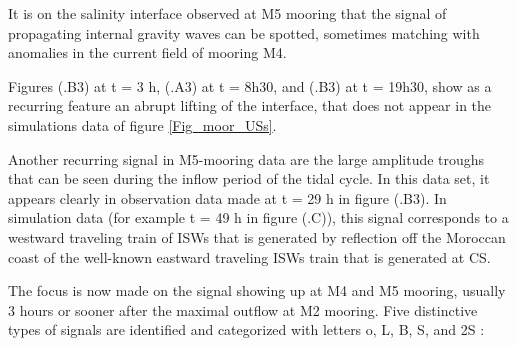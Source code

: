 It is on the salinity interface observed at M5 mooring that the signal of propagating internal gravity waves can be spotted, sometimes matching with anomalies in the current field of mooring M4.

Figures (.B3) at t = 3 h, (.A3) at t = 8h30, and (.B3) at t = 19h30, show as a recurring feature an abrupt lifting of the interface, that does not appear in the simulations data of figure \ref{Fig_moor_USs}.

Another recurring signal in M5-mooring data are the large amplitude troughs that can be seen during the inflow period of the tidal cycle. In this data set, it appears clearly in observation data made at t = 29 h in figure (.B3). In simulation data (for example t = 49 h in figure (.C)), this signal corresponds to a westward traveling train of ISWs that is generated by reflection off the Moroccan coast of the well-known eastward traveling ISWs train that is generated at CS.

The focus is now made on the signal showing up at M4 and M5 mooring, usually 3 hours or sooner after the maximal outflow at M2 mooring. Five distinctive types of signals are identified and categorized with letters o, L, B, S, and 2S :

